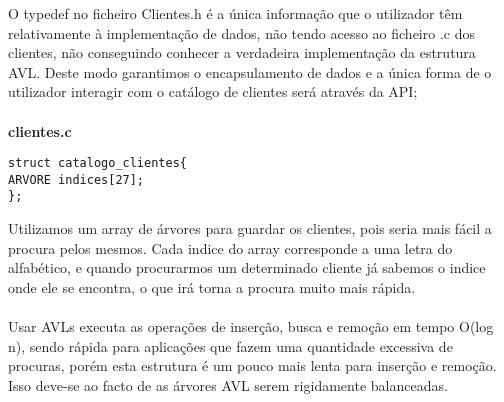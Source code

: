 O typedef no ficheiro Clientes.h é a única informação que o utilizador têm relativamente à implementação de dados, não tendo acesso ao ficheiro .c dos clientes, não conseguindo conhecer a verdadeira implementação da estrutura AVL. Deste modo garantimos o encapsulamento de dados e a única forma de o utilizador interagir com o catálogo de clientes será através da API; 


\paragraph{}
\textbf{clientes.c}
\begin{verbatim}
struct catalogo_clientes{
ARVORE indices[27];
};
\end{verbatim}

Utilizamos um array de árvores para guardar os clientes, pois seria mais fácil a procura pelos mesmos. Cada indice do array corresponde a uma letra do alfabético, e quando procurarmos um determinado cliente já sabemos o indice onde ele se encontra, o que irá torna a procura muito mais rápida. 

\paragraph{}

Usar  AVLs  executa as operações de inserção, busca e remoção em tempo O(log n), sendo rápida  para aplicações que fazem uma quantidade excessiva de procuras, porém esta estrutura é um pouco mais lenta para inserção e remoção. Isso deve-se ao facto de as árvores AVL serem rigidamente balanceadas.


